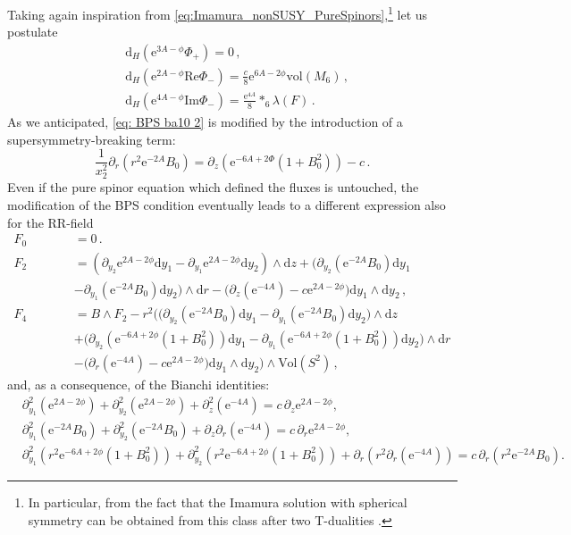 \documentclass[12pt]{article}
\renewcommand{\Re}{\mathrm{Re}}
\renewcommand{\Im}{\mathrm{Im}}
\newcommand{\dd}{\mathrm{d}}
\newcommand{\e}{\mathrm{e}}
\newcommand{\vol}{\mathrm{vol}}
\begin{document}
Taking again inspiration from \eqref{eq:Imamura_nonSUSY_PureSpinors},\footnote{In particular, from the fact that the Imamura solution with spherical symmetry can be obtained from this class after two T-dualities \cite{l-macpherson}.} let us postulate
\begin{subequations}
\label{nonsusy_purespinor_IIA}
\begin{align}
&\dd_H ( \e^{3A-\phi} \Phi_+) = 0 \, ,\\
&\dd_H( \e^{2A-\phi} \Re\Phi_-) = \frac{c}{8} \e^{6A-2\phi} \vol(M_6) \, , \\
&\dd_H ( \e^{4A-\phi}\Im\Phi_-) = \frac{\e^{4A}}{8} *_6 \lambda(F) \, .
\end{align}
\end{subequations} 
As we anticipated,  \eqref{eq: BPS ba10 2} is modified by the introduction of a supersymmetry-breaking term:
\begin{equation}
	\frac{1}{x^2_2} \partial_{r} (r^2 \e^{-2A} B_0) = \partial_{z} (\e^{-6A+2 \Phi}(1+B_0^2 )) -c \, .
\end{equation}
Even if the pure spinor equation which defined the fluxes is untouched, the modification of the BPS condition eventually leads to a different expression also for the RR-field
\begin{equation}
\begin{split}
F_0&=0 \, . \\
F_2 &= (\partial_{y_2}\e^{2A-2\phi} \dd y_1 - \partial_{y_1}\e^{2A-2\phi} \dd y_2  ) \wedge \dd z+\big( \partial_{y_2}(\e^{-2A} B_0) \dd y_1  \\
\qquad \qquad &- \partial_{y_1}(\e^{-2A} B_0) \dd y_2\big) \wedge\dd r- \big(\partial_{z}(\e^{-4A})-c \e^{2A-2 \phi} \big)\dd y_1 \wedge \dd y_2 \, ,\\
F_4 &=B\wedge F_2-r^2\Big(  \big( \partial_{y_2}(\e^{-2A} B_0) \dd y_1 - \partial_{y_1}(\e^{-2A} B_0) \dd y_2\big) \wedge\dd z\\
\qquad \qquad &+ \big(\partial_{y_2}(\e^{-6A+2 \phi}(1+B_0^2)) \dd y_1 - \partial_{y_1}(\e^{-6A+2 \phi}(1+B_0^2)) \dd y_2\big) \wedge \dd r \\
\qquad \qquad &-\big(\partial_{r}(\e^{-4A})-c \e^{2A-2 \phi} \big)\dd y_1 \wedge \dd y_2 \Big)\wedge \text{Vol}(S^2) \, ,
\end{split}
\end{equation}
and, as a consequence, of the Bianchi identities:
\begin{subequations}
	\begin{align}
	&\partial^2_{y_1} (\e^{2A-2\phi})+\partial^2_{y_2} (\e^{2A-2\phi})+\partial^2_{z}(\e^{-4A})=c \,   \partial_{z}\e^{2A-2\phi},\\[2mm]
	&\partial^2_{y_1} (\e^{-2A}B_0)+\partial^2_{y_2} (\e^{-2A}B_0)+\partial_{z} \partial_{r}(\e^{-4A})=c\, \partial_{r}\e^{2A-2\phi},\\[2mm]
	&\partial^2_{y_1}(r^2 \e^{-6A+2\phi}(1+B_0^2))+\partial^2_{y_2}(r^2 \e^{-6A+2\phi}(1+B_0^2))+ \partial_{r}(r^2\partial_{r}(\e^{-4A}))=c \, \partial_{r} (r^2 \e^{-2A}B_0).
	\end{align}
\end{subequations}
\end{document}
